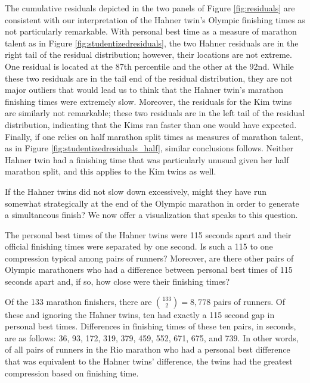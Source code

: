 \documentclass[12pt,titlepage]{article}
\begin{document}
The cumulative residuals depicted in the two panels of Figure
\ref{fig:residuals} are consistent with our interpretation of the
Hahner twin's Olympic finishing times as not particularly
remarkable. With personal best time as a measure of marathon talent as
in Figure \ref{fig:studentizedresiduals}, the two Hahner residuals are
in the right tail of the residual distribution; however, their
locations are not extreme.  One residual is located at the 87th
percentile and the other at the 92nd.  While these two residuals are
in the tail end of the residual distribution, they are not major
outliers that would lead us to think that the Hahner twin's marathon
finishing times were extremely slow.  Moreover, the residuals for the
Kim twins are similarly not remarkable; these two residuals are in the
left tail of the residual distribution, indicating that the Kims ran
faster than one would have expected.  Finally, if one relies on half
marathon split times as measures of marathon talent, as in Figure
\ref{fig:studentizedresiduals_half}, similar conclusions follows.
Neither Hahner twin had a finishing time that was particularly unusual
given her half marathon split, and this applies to the Kim twins as
well.

If the Hahner twins did not slow down excessively, might they have run
somewhat strategically at the end of the Olympic marathon in order to
generate a simultaneous finish?  We now offer a visualization that
speaks to this question.

The personal best times of the Hahner twins were 115 seconds apart and
their official finishing times were separated by one second.  Is such
a 115 to one compression typical among pairs of runners?  Moreover,
are there other pairs of Olympic marathoners who had a difference
between personal best times of 115 seconds apart and, if so, how close
were their finishing times?

Of the 133 marathon finishers, there are $\binom{133}{2} = 8,778$
pairs of runners.  Of these and ignoring the Hahner twins, ten had
exactly a 115 second gap in personal best times.  Differences in
finishing times of these ten pairs, in seconds, are as follows: 36,
93, 172, 319, 379, 459, 552, 671, 675, and 739.  In other words, of
all pairs of runners in the Rio marathon who had a personal best
difference that was equivalent to the Hahner twins' difference, the
twins had the greatest compression based on finishing time.
\end{document}
